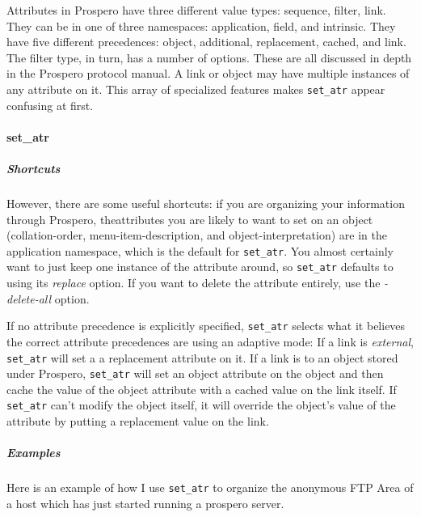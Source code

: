 Attributes in Prospero have three different value types: {\sc
sequence, filter, link}.  They can be in one of three namespaces: {\sc
application, field,} and {\sc intrinsic.} They have five different
precedences: {\sc object, additional, replacement, cached,} and {\sc link.}
The {\sc filter} type, in turn, has a number of options.  These are
all discussed in depth in the Prospero protocol manual.  A link or
object may have multiple instances of any attribute on it.   This array
of specialized features makes {\tt set\_atr} appear confusing at first.

\paragraph{set\_atr}

\subparagraph{Shortcuts}

However, there are some useful shortcuts:  if you are organizing your
information through Prospero, theattributes you are likely to want to
set on an object ({\sc collation-order, menu-item-description,} and {\sc
object-interpretation}) are in the {\sc application} namespace, which
is the default for {\tt set\_atr}.  You almost certainly want to
just keep one instance of the attribute around, so {\tt set\_atr}
defaults to using its {\em replace} option.  If you want to delete the
attribute entirely, use the {\em -delete-all} option.

If no attribute precedence is explicitly specified, {\tt set\_atr}
selects what it believes the correct attribute precedences are using
an adaptive mode: If a link is {\em external}, {\tt set\_atr} will set
a a {\sc replacement} attribute on it.  If a link is to an object
stored under Prospero, {\tt set\_atr} will set an {\sc object}
attribute on the object and then cache the value of the {\sc object}
attribute with a {\sc cached} value on the link itself.  If {\tt
set\_atr} can't modify the object itself, it will override the
object's value of the attribute by putting a {\sc replacement} value
on the link.

\subparagraph{Examples}

Here is an example of how I use {\tt set\_atr} to organize the
anonymous FTP Area of a host which has just started running a prospero
server.  

